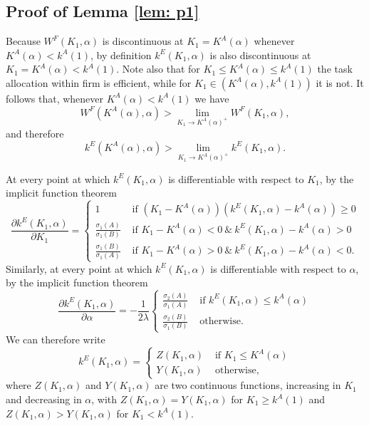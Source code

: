\documentclass[12pt,american]{paper}
\theoremstyle{remark}
\begin{document}
\subsection*{Proof of Lemma \ref{lem: p1}}

Because $W^F(K_1,\alpha)$ is discontinuous at $K_1=K^A(\alpha)$ whenever $K^A(\alpha)<k^A(1)$, by definition $k^E(K_1,\alpha)$ is also discontinuous at $K_1=K^A(\alpha)<k^A(1)$. Note also that for $K_1 \leq K^A(\alpha) \leq k^A(1)$ the task allocation within firm is efficient, while for $K_1\in (K^A(\alpha),k^A(1))$ it is not. It follows that, whenever $K^A(\alpha)<k^A(1)$ we have
\[
W^F(K^A(\alpha),\alpha) > \lim_{K_1\rightarrow K^A(\alpha)^{+}} W^F(K_1,\alpha),
\]
and therefore
\[
k^E(K^A(\alpha),\alpha) > \lim_{K_1\rightarrow K^A(\alpha)^{+}} k^E(K_1,\alpha).
\]

At every point at which $k^E(K_1,\alpha)$ is differentiable with respect to $K_1$, by the implicit function theorem 
\[
\frac{\partial k^E(K_1,\alpha)}{\partial K_1}=\begin{cases} 1 & \mbox{ if } (K_1 - K^A(\alpha))(k^E(K_1,\alpha)-k^A(\alpha))\geq 0 \\ 
\frac{\sigma_1(A)}{\sigma_1(B)} &\mbox{ if }  K_1 - K^A(\alpha)<0~\& ~ k^E(K_1,\alpha)-k^A(\alpha)>0 \\ 
\frac{\sigma_1(B)}{\sigma_1(A)} &\mbox{ if } K_1 - K^A(\alpha)>0~\& ~ k^E(K_1,\alpha)-k^A(\alpha)<0.
\end{cases}
\]
Similarly,  at every point at which $k^E(K_1,\alpha)$ is differentiable with respect to $\alpha$, by the implicit function theorem
\[
\frac{\partial k^E(K_1,\alpha)}{\partial \alpha}=- \frac{1}{2 \lambda}\begin{cases} \frac{\sigma_2(A)}{\sigma_1(A)} &\mbox{ if } k^E(K_1,\alpha)\leq k^A(\alpha) \\ \frac{\sigma_2(B)}{\sigma_1(B)} &\mbox{ otherwise. } \end{cases}
\]
We can therefore write
\[
k^E(K_1,\alpha) =\begin{cases} Z(K_1,\alpha) &\mbox{ if } K_1 \leq K^A(\alpha) \\
Y(K_1, \alpha) &\mbox{ otherwise,} 
\end{cases}
\]
where $Z(K_1,\alpha)$ and $Y(K_1,\alpha)$ are two continuous functions, increasing in $K_1$ and decreasing in $\alpha$, with $Z(K_1,\alpha)=Y(K_1,\alpha)$ for $K_1 \geq k^A(1)$ and $Z(K_1,\alpha) > Y(K_1,\alpha)$ for  $K_1<k^A(1)$.
\end{document}
